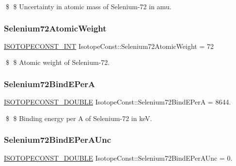 \$ \$ Uncertainty in atomic mass of Selenium-\/72 in amu. \mbox{\label{group___isotope_const-_selenium-_se72_gadf607570f09867688b031cca12566ffc}} 
\subsubsection{\texorpdfstring{Selenium72\+Atomic\+Weight}{Selenium72AtomicWeight}}
{\footnotesize\ttfamily \mbox{\hyperlink{group___isotope_const-_macros_ga5f18360b3e99483a35c32d789e62621c}{I\+S\+O\+T\+O\+P\+E\+C\+O\+N\+S\+T\+\_\+\+I\+NT}} Isotope\+Const\+::\+Selenium72\+Atomic\+Weight = 72}

\$ \$ Atomic weight of Selenium-\/72. \mbox{\label{group___isotope_const-_selenium-_se72_gad0fc208950e78ad24e53be6b8712296e}} 
\subsubsection{\texorpdfstring{Selenium72\+Bind\+E\+PerA}{Selenium72BindEPerA}}
{\footnotesize\ttfamily \mbox{\hyperlink{group___isotope_const-_macros_ga8f45a7272ce02c0b4c65c44636ed719a}{I\+S\+O\+T\+O\+P\+E\+C\+O\+N\+S\+T\+\_\+\+D\+O\+U\+B\+LE}} Isotope\+Const\+::\+Selenium72\+Bind\+E\+PerA = 8644.}

\$ \$ Binding energy per A of Selenium-\/72 in keV. \mbox{\label{group___isotope_const-_selenium-_se72_ga8df34671a2d6c9833cbd52fc2353487a}} 
\subsubsection{\texorpdfstring{Selenium72\+Bind\+E\+Per\+A\+Unc}{Selenium72BindEPerAUnc}}
{\footnotesize\ttfamily \mbox{\hyperlink{group___isotope_const-_macros_ga8f45a7272ce02c0b4c65c44636ed719a}{I\+S\+O\+T\+O\+P\+E\+C\+O\+N\+S\+T\+\_\+\+D\+O\+U\+B\+LE}} Isotope\+Const\+::\+Selenium72\+Bind\+E\+Per\+A\+Unc = 0.}

